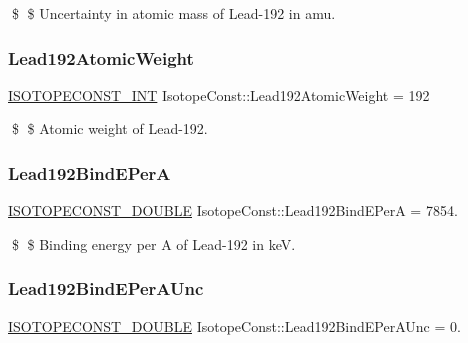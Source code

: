 \$ \$ Uncertainty in atomic mass of Lead-\/192 in amu. \mbox{\label{group___isotope_const-_lead-_pb192_gab6199bbeeb65f578d7558358703e8e85}} 
\subsubsection{\texorpdfstring{Lead192\+Atomic\+Weight}{Lead192AtomicWeight}}
{\footnotesize\ttfamily \mbox{\hyperlink{group___isotope_const-_macros_ga5f18360b3e99483a35c32d789e62621c}{I\+S\+O\+T\+O\+P\+E\+C\+O\+N\+S\+T\+\_\+\+I\+NT}} Isotope\+Const\+::\+Lead192\+Atomic\+Weight = 192}

\$ \$ Atomic weight of Lead-\/192. \mbox{\label{group___isotope_const-_lead-_pb192_ga7c4c01af0ff798687791ab5627b49a39}} 
\subsubsection{\texorpdfstring{Lead192\+Bind\+E\+PerA}{Lead192BindEPerA}}
{\footnotesize\ttfamily \mbox{\hyperlink{group___isotope_const-_macros_ga8f45a7272ce02c0b4c65c44636ed719a}{I\+S\+O\+T\+O\+P\+E\+C\+O\+N\+S\+T\+\_\+\+D\+O\+U\+B\+LE}} Isotope\+Const\+::\+Lead192\+Bind\+E\+PerA = 7854.}

\$ \$ Binding energy per A of Lead-\/192 in keV. \mbox{\label{group___isotope_const-_lead-_pb192_gad83f082f5e0d3783c3dfc97019f7db81}} 
\subsubsection{\texorpdfstring{Lead192\+Bind\+E\+Per\+A\+Unc}{Lead192BindEPerAUnc}}
{\footnotesize\ttfamily \mbox{\hyperlink{group___isotope_const-_macros_ga8f45a7272ce02c0b4c65c44636ed719a}{I\+S\+O\+T\+O\+P\+E\+C\+O\+N\+S\+T\+\_\+\+D\+O\+U\+B\+LE}} Isotope\+Const\+::\+Lead192\+Bind\+E\+Per\+A\+Unc = 0.}

